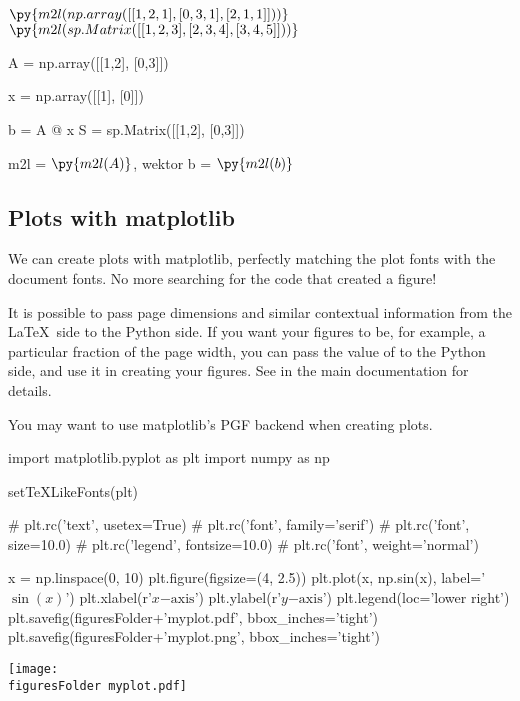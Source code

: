 \documentclass[11pt]{article}
\newcommand{\figuresFolder}{figures/}
\begin{document}
$\py{m2l(np.array([[1,2,1],
               [0,3,1],
               [2,1,1]]))}$
$\py{m2l(sp.Matrix([[1,2,3],
                 [2,3,4],
                 [3,4,5]]))}$

\begin{pycode}
A = np.array([[1,2],
               [0,3]])

x = np.array([[1],
               [0]])

b = A @ x
S = sp.Matrix([[1,2],
               [0,3]])
\end{pycode}

m2l = $\py{m2l(A)}$, 
\quad
wektor b = $\py{m2l(b)}$
\quad 
\subsection{Plots with matplotlib}

We can create plots with matplotlib, perfectly matching the plot fonts with the document fonts.  No more searching for the code that created a figure!

It is possible to pass page dimensions and similar contextual information from the \LaTeX\ side to the Python side.  If you want your figures to be, for example, a particular fraction of the page width, you can pass the value of  to the Python side, and use it in creating your figures.  See  in the main documentation for details.

You may want to use matplotlib's PGF backend when creating plots.

\begin{pyblock}
import matplotlib.pyplot as plt
import numpy as np

setTeXLikeFonts(plt)

# plt.rc('text', usetex=True)
# plt.rc('font', family='serif')
# plt.rc('font', size=10.0)
# plt.rc('legend', fontsize=10.0)
# plt.rc('font', weight='normal')



x = np.linspace(0, 10)
plt.figure(figsize=(4, 2.5))
plt.plot(x, np.sin(x), label='$\sin(x)$')
plt.xlabel(r'$x\mathrm{-axis}$')
plt.ylabel(r'$y\mathrm{-axis}$')
plt.legend(loc='lower right')
plt.savefig(figuresFolder+'myplot.pdf', bbox_inches='tight')
plt.savefig(figuresFolder+'myplot.png', bbox_inches='tight')
\end{pyblock}

\begin{center}
\texttt{[image: \\figuresFolder myplot.pdf]}
\end{center}
\end{document}
